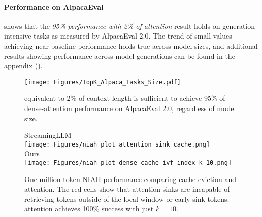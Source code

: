 \paragraph{\Topk Performance on AlpacaEval}
 shows that the \textit{95\% performance with 2\% of attention} result holds on generation-intensive tasks as measured by AlpacaEval 2.0. The trend of small \kk values achieving near-baseline performance holds true across model sizes, and additional results showing performance across model generations can be found in the appendix ().

\begin{figure}[htbp]
    \centering
    \texttt{[image: Figures/TopK\_Alpaca\_Tasks\_Size.pdf]}
    \caption{\kk equivalent to 2\% of context length is sufficient to achieve 95\% of dense-attention performance on AlpacaEval 2.0, regardless of model size.}
    \label{fig:alpaca_eval_topk_results}
\end{figure}

\begin{figure}
    \centering
    StreamingLLM \\
    \texttt{[image: Figures/niah\_plot\_attention\_sink\_cache.png]} \\
    Ours \\
    \texttt{[image: Figures/niah\_plot\_dense\_cache\_ivf\_index\_k\_10.png]}
    \caption{One million token NIAH performance comparing cache eviction \cite{xiao2023streamingllm} and \topk attention. The red cells show that attention sinks are incapable of retrieving tokens outside of the local window or early sink tokens. \Topk attention achieves 100\% success with just $k=10$.}
    \label{fig:niah_plots}
\end{figure}

